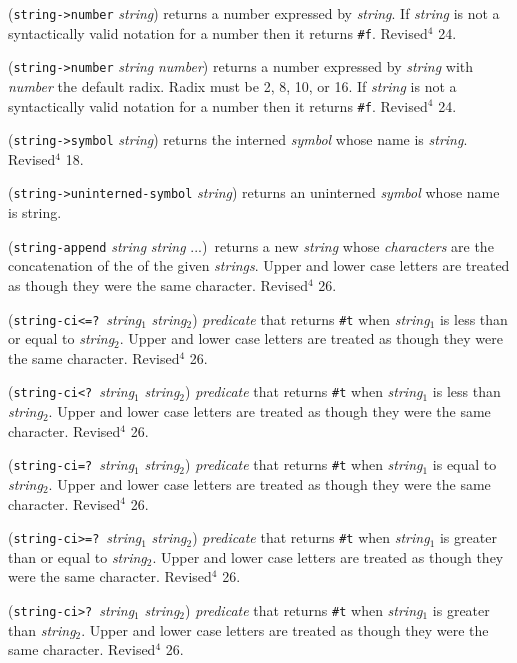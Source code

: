 \documentclass[10pt,twocolumn]{article}
\begin{document}
(\texttt{string->number} \emph{string}) returns a number expressed by
\emph{string}.  If \emph{string} is not a syntactically valid notation for
a number then it returns \texttt{\#f}.  Revised$^4$ 24.

(\texttt{string->number} \emph{string} \emph{number}) returns a number expressed
by \emph{string} with \emph{number} the default radix.  Radix must be 2, 8,
10, or 16. If \emph{string} is not a syntactically valid notation for a
number then it returns \texttt{\#f}.  Revised$^4$ 24.

(\texttt{string->symbol} \emph{string}) returns the interned \emph{symbol} whose
name is \emph{string}.  Revised$^4$ 18.

(\texttt{string->uninterned-symbol} \emph{string}) returns an uninterned
\emph{symbol} whose name is string.

(\texttt{string-append} \emph{string} \emph{string} ...)\ returns a new
\emph{string} whose \emph{characters} are the concatenation of the of the
given \emph{strings}. Upper and lower case letters are treated as though
they were the same character. Revised$^4$ 26.

(\texttt{string-ci<=?}\ \emph{string}$_1$ \emph{string}$_2$) \emph{predicate}
that returns \texttt{\#t} when \emph{string}$_1$ is less than or equal to
\emph{string}$_2$.  Upper and lower case letters are treated as though
they were the same character. Revised$^4$ 26.

(\texttt{string-ci<?}\ \emph{string}$_1$ \emph{string}$_2$) \emph{predicate} that
returns \texttt{\#t} when \emph{string}$_1$ is less than \emph{string}$_2$.
Upper and lower case letters are treated as though they were the same
character. Revised$^4$ 26.

(\texttt{string-ci=?}\ \emph{string}$_1$ \emph{string}$_2$) \emph{predicate} that
returns \texttt{\#t} when \emph{string}$_1$ is equal to \emph{string}$_2$.
Upper and lower case letters are treated as though they were the same
character. Revised$^4$ 26.

(\texttt{string-ci>=?}\ \emph{string}$_1$ \emph{string}$_2$) \emph{predicate}
that returns \texttt{\#t} when \emph{string}$_1$ is greater than or equal to
\emph{string}$_2$.  Upper and lower case letters are treated as though
they were the same character. Revised$^4$ 26.

(\texttt{string-ci>?}\ \emph{string}$_1$ \emph{string}$_2$) \emph{predicate} that
returns \texttt{\#t} when \emph{string}$_1$ is greater than \emph{string}$_2$.
Upper and lower case letters are treated as though they were the same
character. Revised$^4$ 26.
\end{document}
